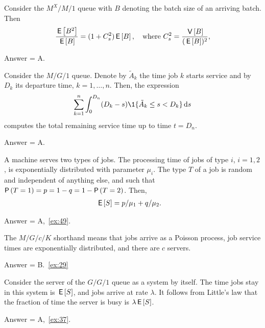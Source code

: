 \begin{exercise}[201903]
 Consider the $M^X/M/1$ queue with $B$ denoting the batch size of an arriving batch. Then
\begin{equation*}
 \frac{\,\mathsf{E}\left[B^2\right]}{\,\mathsf{E}\left[B\right]} = (1+C_s^2)\,\mathsf{E}\left[B\right], \quad\text{where }
C_s^2 = \frac{\,\mathsf{V}\left[B\right]}{(\,\mathsf{E}\left[B\right])^2},
\end{equation*}

\begin{solution}
Answer = A.
\end{solution}
\end{exercise}

\begin{exercise}[201903]
Consider the $M/G/1$ queue. Denote by $\tilde{A}_k$ the time job $k$ starts service and by $D_k$ its departure time, $k=1,\ldots,n$. Then, the expression
\begin{equation*}
\sum_{k=1}^{n} \int_0^{D_n} (D_k-s)\1{\tilde A_k \leq s < D_k} \d s
\end{equation*}
computes the total remaining service time up to time $t = D_n$.
\begin{solution}
Answer = A.
\end{solution}
\end{exercise}

\begin{exercise}[201904]
 A machine serves two types of jobs.
 The processing time of jobs of type $i$, $i=1,2$, is exponentially distributed with parameter $\mu_i$.
 The type $T$ of a job is random and independent of anything else, and such that $\P{T=1} = p = 1-q = 1-\P{T=2}$. Then,
\begin{align*}
 \,\mathsf{E}\left[S\right] &= p/\mu_1 + q/\mu_2.
 \end{align*}
\begin{solution}
Answer = A,~\cref{ex:49}.
\end{solution}
\end{exercise}

\begin{exercise}[201904]
The $M/G/c/K$ shorthand means that jobs arrive as a Poisson process, job service times are exponentially distributed, and there are $c$ servers.
\begin{solution} Answer = B.~\cref{ex:29}
\end{solution}
\end{exercise}


\begin{exercise}[201904]
 Consider the server of the $G/G/1$ queue as a system by itself.
 The time jobs stay in this system is $\,\mathsf{E}\left[S\right]$, and jobs arrive at rate $\lambda$.
 It follows from Little's law that the fraction of time the server is busy is $\lambda \,\mathsf{E}\left[S\right]$.
\begin{solution} Answer = A,~\cref{ex:37}.
\end{solution}
\end{exercise}

